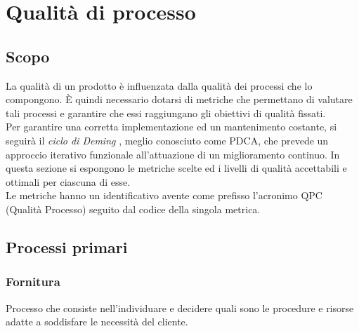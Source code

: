 

\section{Qualità di processo}
\subsection{Scopo}
La qualità di un prodotto è influenzata dalla qualità dei processi che lo compongono.
È quindi necessario dotarsi di metriche che permettano di valutare tali processi e garantire che essi
raggiungano gli obiettivi di qualità fissati.\\
Per garantire una corretta implementazione ed un mantenimento costante, si seguirà 
il \textit{ciclo di Deming} , meglio conosciuto come PDCA, che prevede un approccio iterativo funzionale
all'attuazione di un miglioramento continuo.
In questa sezione si espongono le metriche scelte ed i livelli di qualità accettabili e ottimali per ciascuna
di esse.\\
Le metriche hanno un identificativo avente come prefisso l'acronimo QPC (Qualità Processo) seguito dal codice della singola metrica.\\

\subsection{Processi primari}

\subsubsection{Fornitura}
Processo che consiste nell'individuare e decidere quali sono le procedure e risorse adatte a soddisfare le necessità del cliente.\\
